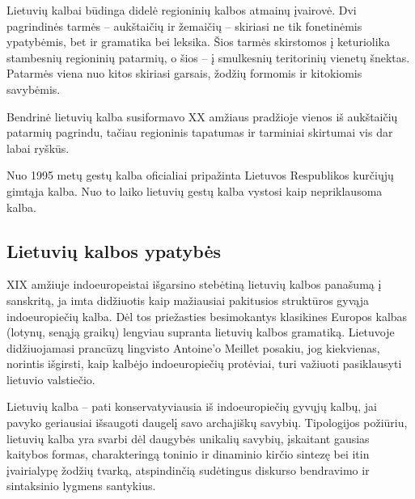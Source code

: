 \documentclass[]{../metanetpaper}
\begin{document}
\begin{multicols}{2}
Lietuvių kalbai būdinga didelė regioninių kalbos atmainų įvairovė. Dvi pagrindinės tarmės – aukštaičių ir žemaičių – skiriasi ne tik fonetinėmis ypatybėmis, bet ir gramatika bei leksika. Šios tarmės skirstomos į keturiolika stambesnių regioninių patarmių, o šios – į smulkesnių teritorinių vienetų šnektas. Patarmės viena nuo kitos skiriasi garsais, žodžių formomis ir kitokiomis savybėmis.

Bendrinė lietuvių kalba susiformavo XX amžiaus pradžioje vienos iš aukštaičių patarmių pagrindu, tačiau regioninis tapatumas ir tarminiai skirtumai vis dar labai ryškūs.

Nuo 1995 metų gestų kalba oficialiai pripažinta Lietuvos Respublikos kurčiųjų gimtąja kalba. Nuo to laiko lietuvių gestų kalba vystosi kaip nepriklausoma kalba.

\subsection{Lietuvių kalbos ypatybės}

 XIX amžiuje indoeuropeistai išgarsino stebėtiną lietuvių kalbos panašumą į sanskritą, ja imta didžiuotis kaip mažiausiai pakitusios struktūros gyvąja indoeuropiečių kalba. Dėl tos priežasties besimokantys klasikines Europos kalbas (lotynų, senąją graikų) lengviau supranta lietuvių kalbos gramatiką. Lietuvoje didžiuojamasi prancūzų lingvisto Antoine’o Meillet posakiu, jog kiekvienas, norintis išgirsti, kaip kalbėjo indoeuropiečių protėviai, turi važiuoti pasiklausyti lietuvio valstiečio.

Lietuvių kalba – pati konservatyviausia iš indoeuropiečių gyvųjų kalbų, jai pavyko geriausiai išsaugoti daugelį savo archajiškų savybių. Tipologijos požiūriu, lietuvių kalba yra svarbi dėl daugybės unikalių savybių, įskaitant gausias kaitybos formas, charakteringą toninio ir dinaminio kirčio sintezę bei itin įvairialypę žodžių tvarką, atspindinčią sudėtingus diskurso bendravimo ir sintaksinio lygmens santykius.


\end{multicols}
\end{document}
